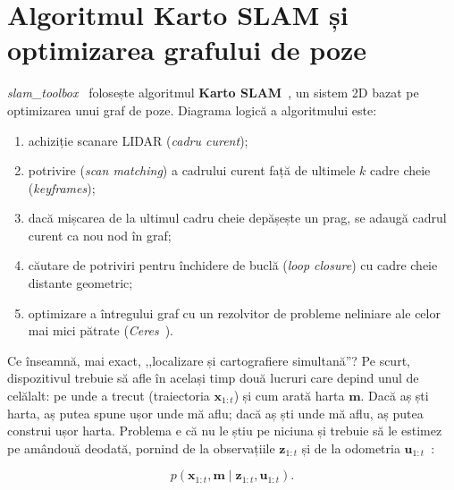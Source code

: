 \documentclass[a4paper,12pt,twoside,openany]{report}
\begin{document}

\section{Algoritmul Karto SLAM și optimizarea grafului de poze}
\label{sec:karto}

\textit{slam\_toolbox}~\cite{macenski2021slamtoolbox} folosește algoritmul
\textbf{Karto SLAM}~\cite{konolige2010karto}, un sistem 2D bazat pe
optimizarea unui graf de poze. Diagrama logică a algoritmului este:

\begin{enumerate}\itemsep0pt
    \item achiziție scanare LIDAR (\textit{cadru curent});
    \item potrivire (\textit{scan matching}) a cadrului curent față de
          ultimele $k$ cadre cheie (\textit{keyframes});
    \item dacă mișcarea de la ultimul cadru cheie depășește un prag, se
          adaugă cadrul curent ca nou nod în graf;
    \item căutare de potriviri pentru închidere de buclă (\textit{loop
          closure}) cu cadre cheie distante geometric;
    \item optimizare a întregului graf cu un rezolvitor de probleme
          neliniare ale celor mai mici pătrate
          (\textit{Ceres}~\cite{ceres_solver}).
\end{enumerate}

Ce înseamnă, mai exact, ,,localizare și cartografiere simultană''? Pe scurt,
dispozitivul trebuie să afle în același timp două lucruri care depind unul de
celălalt: pe unde a trecut (traiectoria $\mathbf{x}_{1:t}$) și cum arată harta
$\mathbf{m}$. Dacă aș ști harta, aș putea spune ușor unde mă aflu; dacă aș ști
unde mă aflu, aș putea construi ușor harta. Problema e că nu le știu pe niciuna
și trebuie să le estimez pe amândouă deodată, pornind de la observațiile
$\mathbf{z}_{1:t}$ și de la odometria $\mathbf{u}_{1:t}$~\cite{thrun2005probrobotics}:

\begin{equation}\label{eq:slam-posterior}
    p(\mathbf{x}_{1:t}, \mathbf{m} \mid \mathbf{z}_{1:t}, \mathbf{u}_{1:t}).
\end{equation}
\end{document}

